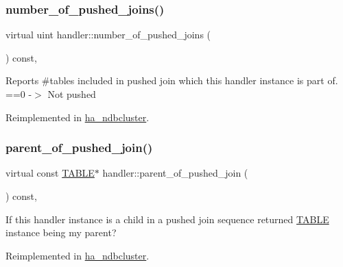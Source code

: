 \mbox{\label{classhandler_a86930bf10b20ad19b3df07e07d28116e}} 
\subsubsection{\texorpdfstring{number\+\_\+of\+\_\+pushed\+\_\+joins()}{number\_of\_pushed\_joins()}}
{\footnotesize\ttfamily virtual uint handler\+::number\+\_\+of\+\_\+pushed\+\_\+joins (\begin{DoxyParamCaption}{ }\end{DoxyParamCaption}) const\hspace{0.3cm}{\ttfamily [inline]}, {\ttfamily [virtual]}}

Reports \#tables included in pushed join which this handler instance is part of. ==0 -\/$>$ Not pushed 

Reimplemented in \mbox{\hyperlink{classha__ndbcluster_a6aaba12f45b013e5dc180f40463e802a}{ha\+\_\+ndbcluster}}.

\mbox{\label{classhandler_aaef865015edc575d0a50d1a6f5b13e4a}} 
\subsubsection{\texorpdfstring{parent\+\_\+of\+\_\+pushed\+\_\+join()}{parent\_of\_pushed\_join()}}
{\footnotesize\ttfamily virtual const \mbox{\hyperlink{structTABLE}{T\+A\+B\+LE}}$\ast$ handler\+::parent\+\_\+of\+\_\+pushed\+\_\+join (\begin{DoxyParamCaption}{ }\end{DoxyParamCaption}) const\hspace{0.3cm}{\ttfamily [inline]}, {\ttfamily [virtual]}}

If this handler instance is a child in a pushed join sequence returned \mbox{\hyperlink{structTABLE}{T\+A\+B\+LE}} instance being my parent? 

Reimplemented in \mbox{\hyperlink{classha__ndbcluster_a9faa32fde75fed4ebafffd11b6c5638e}{ha\+\_\+ndbcluster}}.

\mbox{\label{classhandler_a03831da80c8a99422edd4b4ab84fa55a}} 
